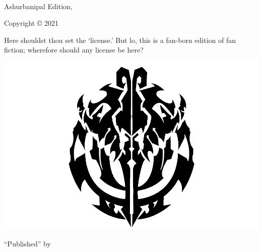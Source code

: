 
{\small
\setlength{\parindent}{0em}\setlength{\parskip}{1em}
~
\vfill

Ashurbanipal Edition, \editionyear{}

Copyright \copyright{} 2021 \authorname

Here shouldst thou set the ‘license.’ But lo, this is a fan-born edition of fan fiction; wherefore should any license be here?

\ifx\isbn\undefined\else\if\relax\detokenize\expandafter{\isbn}\relax{}\fi\fi

\includegraphics[width=0.07\linewidth]{res/AOG.png}

``Published'' by \publisher{}
}
